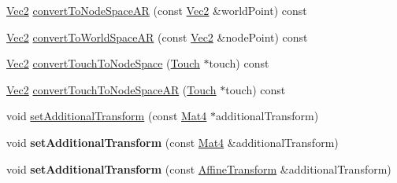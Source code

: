 \begin{Indent}
\begin{DoxyCompactItemize}
\item 
\hyperlink{classVec2}{Vec2} \hyperlink{classNode_a9c7e573a38882cc0727c5f8f65cd9187}{convert\+To\+Node\+Space\+AR} (const \hyperlink{classVec2}{Vec2} \&world\+Point) const
\item 
\hyperlink{classVec2}{Vec2} \hyperlink{classNode_a84c532f970a06aec83dc881e70526b8e}{convert\+To\+World\+Space\+AR} (const \hyperlink{classVec2}{Vec2} \&node\+Point) const
\item 
\hyperlink{classVec2}{Vec2} \hyperlink{classNode_a6ff92b98917dbaea150b90b578a84fca}{convert\+Touch\+To\+Node\+Space} (\hyperlink{classTouch}{Touch} $\ast$touch) const
\item 
\hyperlink{classVec2}{Vec2} \hyperlink{classNode_af9a987bf0d6590367c254e78426773af}{convert\+Touch\+To\+Node\+Space\+AR} (\hyperlink{classTouch}{Touch} $\ast$touch) const
\item 
void \hyperlink{classNode_a7375e0112b9bf3e5ace5afb32a5cd044}{set\+Additional\+Transform} (const \hyperlink{classMat4}{Mat4} $\ast$additional\+Transform)
\item 
\mbox{\label{classNode_a1f377b57a7924d17caa0d012306feb09}} 
void {\bfseries set\+Additional\+Transform} (const \hyperlink{classMat4}{Mat4} \&additional\+Transform)
\item 
\mbox{\label{classNode_ab7758edc645887a1f811ef9d680df64a}} 
void {\bfseries set\+Additional\+Transform} (const \hyperlink{structAffineTransform}{Affine\+Transform} \&additional\+Transform)
\end{DoxyCompactItemize}
\end{Indent}
